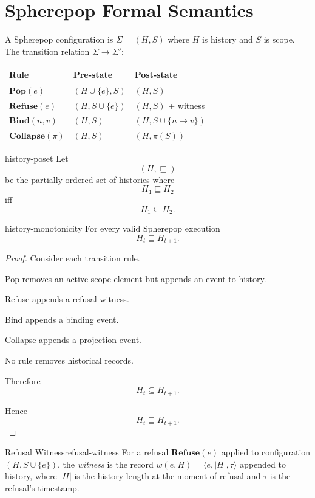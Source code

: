 \documentclass[12pt,twoside,openright]{book}
\begin{document}
\section{Spherepop Formal Semantics}

A Spherepop configuration is $\Sigma = (H, S)$
where $H$ is history and $S$ is scope.
The transition relation $\Sigma \to \Sigma'$:

\medskip
\begin{center}
\begin{tabular}{lll}
\toprule
Rule & Pre-state & Post-state \\
\midrule
$\mathbf{Pop}(e)$      & $(H \cup \{e\}, S)$ & $(H, S)$ \\
$\mathbf{Refuse}(e)$   & $(H, S \cup \{e\})$ & $(H, S)$ + witness \\
$\mathbf{Bind}(n,v)$   & $(H, S)$ & $(H, S \cup \{n \mapsto v\})$ \\
$\mathbf{Collapse}(\pi)$ & $(H, S)$ & $(H, \pi(S))$ \\
\bottomrule
\end{tabular}
\end{center}

\begin{definition}{history-poset}
Let
\[
(H,\sqsubseteq)
\]
be the partially ordered set of histories where
\[
H_1
\sqsubseteq
H_2
\]
iff
\[
H_1
\subseteq
H_2.
\]
\end{definition}

\begin{theorem}{history-monotonicity}
For every valid Spherepop execution
\[
H_t
\sqsubseteq
H_{t+1}.
\]
\end{theorem}

\begin{proof}
Consider each transition rule.

Pop removes an active scope element but appends an event
to history.

Refuse appends a refusal witness.

Bind appends a binding event.

Collapse appends a projection event.

No rule removes historical records.

Therefore
\[
H_t
\subseteq
H_{t+1}.
\]

Hence
\[
H_t
\sqsubseteq
H_{t+1}.
\]
\end{proof}

\begin{definition}{Refusal Witness}{refusal-witness}
  For a refusal $\mathbf{Refuse}(e)$ applied to
  configuration $(H, S \cup \{e\})$, the \emph{witness}
  is the record
  $w(e, H) = \langle e, |H|, \tau \rangle$ appended to
  history, where $|H|$ is the history length at the moment
  of refusal and $\tau$ is the refusal's timestamp.
\end{definition}
\end{document}
